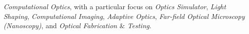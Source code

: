 \textit{Computational Optics}, with a particular focus on \textit{Optics Simulator}, \textit{Light Shaping}, \textit{Computational Imaging}, \textit{Adaptive Optics}, \textit{Far-field Optical Microscopy (Nanoscopy)}, and \textit{Optical Fabrication \(\&\) Testing}.